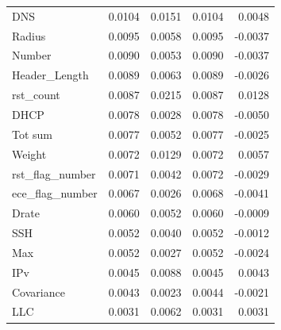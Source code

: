 \begin{tabular}{lrrrr}
DNS & 0.0104 & 0.0151 & 0.0104 & 0.0048 \\
Radius & 0.0095 & 0.0058 & 0.0095 & -0.0037 \\
Number & 0.0090 & 0.0053 & 0.0090 & -0.0037 \\
Header\_Length & 0.0089 & 0.0063 & 0.0089 & -0.0026 \\
rst\_count & 0.0087 & 0.0215 & 0.0087 & 0.0128 \\
DHCP & 0.0078 & 0.0028 & 0.0078 & -0.0050 \\
Tot sum & 0.0077 & 0.0052 & 0.0077 & -0.0025 \\
Weight & 0.0072 & 0.0129 & 0.0072 & 0.0057 \\
rst\_flag\_number & 0.0071 & 0.0042 & 0.0072 & -0.0029 \\
ece\_flag\_number & 0.0067 & 0.0026 & 0.0068 & -0.0041 \\
Drate & 0.0060 & 0.0052 & 0.0060 & -0.0009 \\
SSH & 0.0052 & 0.0040 & 0.0052 & -0.0012 \\
Max & 0.0052 & 0.0027 & 0.0052 & -0.0024 \\
IPv & 0.0045 & 0.0088 & 0.0045 & 0.0043 \\
Covariance & 0.0043 & 0.0023 & 0.0044 & -0.0021 \\
LLC & 0.0031 & 0.0062 & 0.0031 & 0.0031 \\
\bottomrule
\end{tabular}
